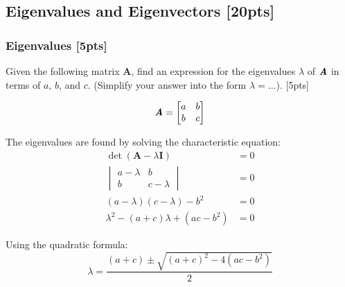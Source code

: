 \documentclass{article}
\begin{document}
\newpage



\subsection{Eigenvalues and Eigenvectors [20pts]}
\subsubsection{Eigenvalues [5pts]}
Given the following matrix $\boldsymbol{A}$, find an expression for the eigenvalues $\lambda$ of $\textbf{\textit{A}}$ in terms of $a$, $b$, and $c$. \newline (Simplify your answer into the form $\lambda = ...$). [5pts] 

$$\textbf{\textit{A}}=\begin{bmatrix}
    a & b \\
    b & c
\end{bmatrix}$$

The eigenvalues are found by solving the characteristic equation:
\begin{align*}
    \det(\boldsymbol{A} - \lambda \boldsymbol{I}) &= 0 \\
    \begin{vmatrix} a - \lambda & b \\ b & c - \lambda \end{vmatrix} &= 0 \\
    (a - \lambda)(c - \lambda) - b^2 &= 0 \\
    \lambda^2 - (a+c)\lambda + (ac - b^2) &= 0
\end{align*}

Using the quadratic formula:
\[ \lambda = \frac{(a+c) \pm \sqrt{(a+c)^2 - 4(ac - b^2)}}{2} \]
\end{document}
